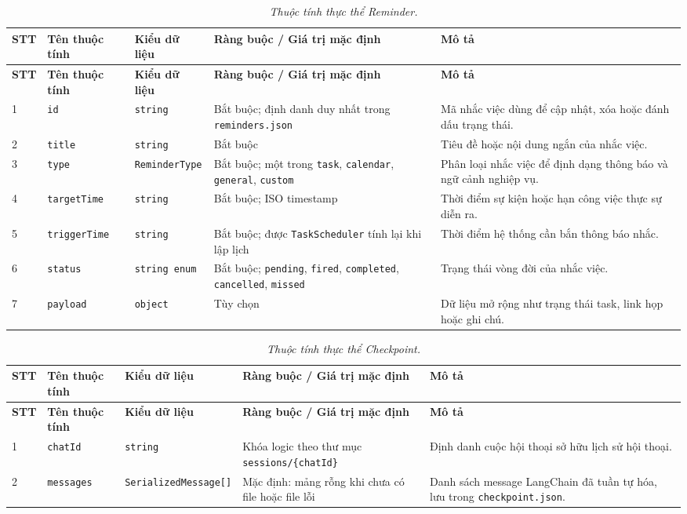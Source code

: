 \begin{longtable}{|p{0.55cm}|p{2.55cm}|p{2.7cm}|p{3.25cm}|p{4.0cm}|}
\caption{\emph{Thuộc tính thực thể Reminder.}}\label{tab:erd-reminder}\\
\hline
\textbf{STT} & \textbf{Tên thuộc tính} & \textbf{Kiểu dữ liệu} & \textbf{Ràng buộc / Giá trị mặc định} & \textbf{Mô tả} \\
\hline
\endfirsthead
\hline
\textbf{STT} & \textbf{Tên thuộc tính} & \textbf{Kiểu dữ liệu} & \textbf{Ràng buộc / Giá trị mặc định} & \textbf{Mô tả} \\
\hline
\endhead
1 & \texttt{id} & \texttt{string} & Bắt buộc; định danh duy nhất trong \texttt{reminders.json} & Mã nhắc việc dùng để cập nhật, xóa hoặc đánh dấu trạng thái. \\
\hline
2 & \texttt{title} & \texttt{string} & Bắt buộc & Tiêu đề hoặc nội dung ngắn của nhắc việc. \\
\hline
3 & \texttt{type} & \texttt{ReminderType} & Bắt buộc; một trong \texttt{task}, \texttt{calendar}, \texttt{general}, \texttt{custom} & Phân loại nhắc việc để định dạng thông báo và ngữ cảnh nghiệp vụ. \\
\hline
4 & \texttt{targetTime} & \texttt{string} & Bắt buộc; ISO timestamp & Thời điểm sự kiện hoặc hạn công việc thực sự diễn ra. \\
\hline
5 & \texttt{triggerTime} & \texttt{string} & Bắt buộc; được \texttt{TaskScheduler} tính lại khi lập lịch & Thời điểm hệ thống cần bắn thông báo nhắc. \\
\hline
6 & \texttt{status} & \texttt{string enum} & Bắt buộc; \texttt{pending}, \texttt{fired}, \texttt{completed}, \texttt{cancelled}, \texttt{missed} & Trạng thái vòng đời của nhắc việc. \\
\hline
7 & \texttt{payload} & \texttt{object} & Tùy chọn & Dữ liệu mở rộng như trạng thái task, link họp hoặc ghi chú. \\
\hline
\end{longtable}

\begin{longtable}{|p{0.55cm}|p{2.55cm}|p{2.7cm}|p{3.25cm}|p{4.0cm}|}
\caption{\emph{Thuộc tính thực thể Checkpoint.}}\label{tab:erd-checkpoint}\\
\hline
\textbf{STT} & \textbf{Tên thuộc tính} & \textbf{Kiểu dữ liệu} & \textbf{Ràng buộc / Giá trị mặc định} & \textbf{Mô tả} \\
\hline
\endfirsthead
\hline
\textbf{STT} & \textbf{Tên thuộc tính} & \textbf{Kiểu dữ liệu} & \textbf{Ràng buộc / Giá trị mặc định} & \textbf{Mô tả} \\
\hline
\endhead
1 & \texttt{chatId} & \texttt{string} & Khóa logic theo thư mục \texttt{sessions/\{chatId\}} & Định danh cuộc hội thoại sở hữu lịch sử hội thoại. \\
\hline
2 & \texttt{messages} & \texttt{Serialized}\newline\texttt{Message[]} & Mặc định: mảng rỗng khi chưa có file hoặc file lỗi & Danh sách message LangChain đã tuần tự hóa, lưu trong \texttt{checkpoint.json}. \\
\hline
\end{longtable}

